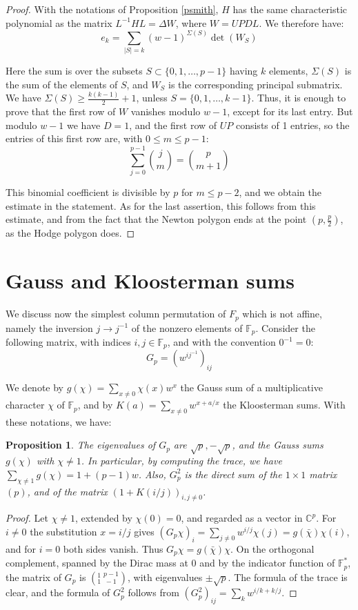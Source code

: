 \documentclass[11pt]{amsart}
\newtheorem{proposition}[theorem]{Proposition}
\theoremstyle{definition}
\begin{document}
\begin{proof}
With the notations of Proposition \ref{psmith}, $H$ has the same characteristic polynomial as the matrix $L^{-1}HL=\Delta W$, where $W=UPDL$. We therefore have:
$$e_k=\sum_{|S|=k}(w-1)^{\Sigma(S)}\det(W_S)$$

Here the sum is over the subsets $S\subset\{0,1,\ldots,p-1\}$ having $k$ elements, $\Sigma(S)$ is the sum of the elements of $S$, and $W_S$ is the corresponding principal submatrix. We have $\Sigma(S)\geq\frac{k(k-1)}{2}+1$, unless $S=\{0,1,\ldots,k-1\}$. Thus, it is enough to prove that the first row of $W$ vanishes modulo $w-1$, except for its last entry. But modulo $w-1$ we have $D=1$, and the first row of $UP$ consists of 1 entries, so the entries of this first row are, with $0\leq m\leq p-1$:
$$\sum_{j=0}^{p-1}\binom{j}{m}=\binom{p}{m+1}$$

This binomial coefficient is divisible by $p$ for $m\leq p-2$, and we obtain the estimate in the statement. As for the last assertion, this follows from this estimate, and from the fact that the Newton polygon ends at the point $(p,\frac{p}{2})$, as the Hodge polygon does.
\end{proof}

\section{Gauss and Kloosterman sums}

We discuss now the simplest column permutation of $F_p$ which is not affine, namely the inversion $j\to j^{-1}$ of the nonzero elements of $\mathbb F_p$. Consider the following matrix, with indices $i,j\in\mathbb F_p$, and with the convention $0^{-1}=0$:
$$G_p=(w^{ij^{-1}})_{ij}$$

We denote by $g(\chi)=\sum_{x\neq0}\chi(x)w^x$ the Gauss sum of a multiplicative character $\chi$ of $\mathbb F_p$, and by $K(a)=\sum_{x\neq0}w^{x+a/x}$ the Kloosterman sums. With these notations, we have:

\begin{proposition}\label{pgauss}
The eigenvalues of $G_p$ are $\sqrt{p},-\sqrt{p}$, and the Gauss sums $g(\chi)$ with $\chi\neq1$. In particular, by computing the trace, we have $\sum_{\chi\neq1}g(\chi)=1+(p-1)w$. Also, $G_p^2$ is the direct sum of the $1\times1$ matrix $(p)$, and of the matrix $(1+K(i/j))_{i,j\neq0}$.
\end{proposition}

\begin{proof}
Let $\chi\neq1$, extended by $\chi(0)=0$, and regarded as a vector in $\mathbb C^p$. For $i\neq0$ the substitution $x=i/j$ gives $(G_p\chi)_i=\sum_{j\neq0}w^{i/j}\chi(j)=g(\bar{\chi})\chi(i)$, and for $i=0$ both sides vanish. Thus $G_p\chi=g(\bar{\chi})\chi$. On the orthogonal complement, spanned by the Dirac mass at 0 and by the indicator function of $\mathbb F_p^*$, the matrix of $G_p$ is $(^1_1{\ }^{p-1}_{\,-1})$, with eigenvalues $\pm\sqrt{p}$. The formula of the trace is clear, and the formula of $G_p^2$ follows from $(G_p^2)_{ij}=\sum_kw^{i/k+k/j}$.
\end{proof}
\end{document}
